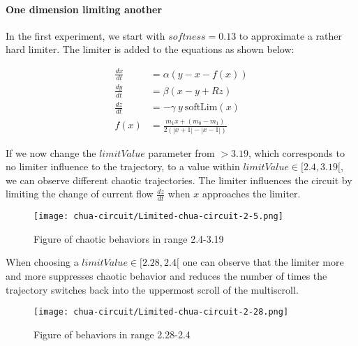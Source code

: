 \documentclass[main]{subfiles}
\begin{document}
\paragraph{One dimension limiting another}

In the first experiment, we start with \(softness=0.13\) to approximate a rather hard limiter. The limiter is added to the equations as shown below:

\begin{align*}
\frac{dx}{dt}&=\alpha (y-x-f(x)) \\
\frac{dy}{dt}&=\beta (x-y + Rz)\\
\frac{dz}{dt}&=-\gamma ~ y ~ \text{softLim}(x)\\
f (x) &= \frac{m_1 x + (m_0 - m_1)}{2 (| x + 1 | -| x - 1 |)}
\end{align*}

If we now change the $limitValue$ parameter from \(>3.19\), which corresponds to no limiter influence to the trajectory, to a value within \(limitValue \in [2.4,3.19[\), we can observe different chaotic trajectories. The limiter influences the circuit by limiting the change of current flow \(\frac{dz}{dt}\) when \(x\) approaches the limiter.


\begin{figure}[H]
\centering
\texttt{[image: chua-circuit/Limited-chua-circuit-2-5.png]}
\caption[Figure of chaotic behaviors in range 2.4-3.19]{Figure of chaotic behaviors in range 2.4-3.19}
\label{figure:chaotictrajectories}
\end{figure}

When choosing a \(limitValue \in [2.28,2.4[\) one can observe that the limiter more and more suppresses chaotic behavior and reduces the number of times the trajectory switches back into the uppermost scroll of the multiscroll.

\begin{figure}[H]
\centering
\texttt{[image: chua-circuit/Limited-chua-circuit-2-28.png]}
\caption[Figure of behaviors in range 2.28-2.4]{Figure of behaviors in range 2.28-2.4}
\label{figure:chaotictrajectories}
\end{figure}
\end{document}
